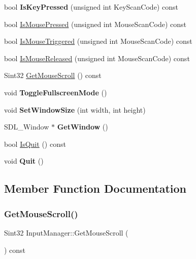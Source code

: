 \begin{DoxyCompactItemize}
bool {\bfseries Is\+Key\+Pressed} (unsigned int Key\+Scan\+Code) const
\item 
bool \hyperlink{classInputManager_a7f316cdb11213c7973a0b601a0193d8a}{Is\+Mouse\+Pressed} (unsigned int Mouse\+Scan\+Code) const
\item 
bool \hyperlink{classInputManager_a036f8dd3a4416c43b0c2942a3c5bb093}{Is\+Mouse\+Triggered} (unsigned int Mouse\+Scan\+Code) const
\item 
bool \hyperlink{classInputManager_af72d6f8ceb3219220b36a6cc447a42db}{Is\+Mouse\+Released} (unsigned int Mouse\+Scan\+Code) const
\item 
Sint32 \hyperlink{classInputManager_a46c6625efeeb61dbde4c21bb81837f0c}{Get\+Mouse\+Scroll} () const
\item 
\mbox{\label{classInputManager_ab5626920e4495bea71dcac27bfc8483a}} 
void {\bfseries Toggle\+Fullscreen\+Mode} ()
\item 
\mbox{\label{classInputManager_ade1cde5e543ad62af1730da51e3f2a5d}} 
void {\bfseries Set\+Window\+Size} (int width, int height)
\item 
\mbox{\label{classInputManager_aba5c089cd936fd808981a22f2d3627f1}} 
S\+D\+L\+\_\+\+Window $\ast$ {\bfseries Get\+Window} ()
\item 
bool \hyperlink{classInputManager_a926e42475408a078ebe5395f95289df2}{Is\+Quit} () const
\item 
\mbox{\label{classInputManager_a28245a4d8a06e4bcc6a4af0356f694ca}} 
void {\bfseries Quit} ()
\end{DoxyCompactItemize}


\subsection{Member Function Documentation}
\mbox{\label{classInputManager_a46c6625efeeb61dbde4c21bb81837f0c}} 
\subsubsection{\texorpdfstring{Get\+Mouse\+Scroll()}{GetMouseScroll()}}
{\footnotesize\ttfamily Sint32 Input\+Manager\+::\+Get\+Mouse\+Scroll (\begin{DoxyParamCaption}{ }\end{DoxyParamCaption}) const}

